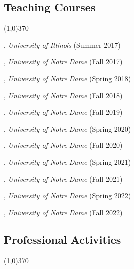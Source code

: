 \documentclass[10pt]{article}
\newenvironment{myindentpar}[1]%
{\begin{list}{}%
         {\setlength{\leftmargin}{#1}}%
         \item[]%
}
{\end{list}}
\newcounter{list}
\begin{document}
\subsection{\sc Teaching Courses}
\vspace{-0.4cm} \line(1,0){370} \vspace{-0.1cm}

\begin{myindentpar}{0.75cm}

\hspace{-0.75cm}{\bf CS 412 Introduction to Data Mining}, \textit{University of Illinois} (Summer 2017)
	
\hspace{-0.75cm}{\bf CSE 40647/60647 Data Science}, \textit{University of Notre Dame} (Fall 2017)

\hspace{-0.75cm}{\bf CSE 40647/60647 Data Science}, \textit{University of Notre Dame} (Spring 2018)

\hspace{-0.75cm}{\bf CSE 40647/60647 Data Science}, \textit{University of Notre Dame} (Fall 2018)

\hspace{-0.75cm}{\bf CSE 40647/60647 Data Science}, \textit{University of Notre Dame} (Fall 2019)

\hspace{-0.75cm}{\bf CSE 60326 Computational Behavior Modeling}, \textit{University of Notre Dame} (Spring 2020)

\hspace{-0.75cm}{\bf CSE 40647/60647 Data Science}, \textit{University of Notre Dame} (Fall 2020)

\hspace{-0.75cm}{\bf CSE 60326 Computational Behavior Modeling}, \textit{University of Notre Dame} (Spring 2021)

\hspace{-0.75cm}{\bf CSE 40647/60647 Data Science}, \textit{University of Notre Dame} (Fall 2021)

\hspace{-0.75cm}{\bf CSE 60326 Computational Behavior Modeling}, \textit{University of Notre Dame} (Spring 2022)

\hspace{-0.75cm}{\bf CSE 40647/60647 Data Science}, \textit{University of Notre Dame} (Fall 2022)

\end{myindentpar}

\subsection{\sc Professional Activities}
\vspace{-0.4cm} \line(1,0){370} \vspace{-0.1cm}
\end{document}
